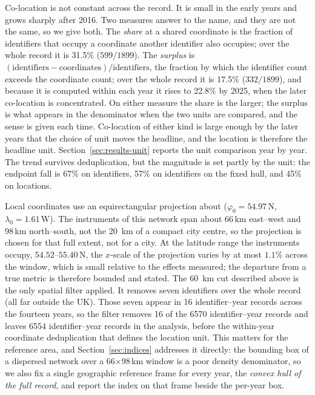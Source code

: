 \documentclass{article}
\newcommand{\rDrop}{67}
\newcommand{\locHullDrop}{45}
\newcommand{\rHullDrop}{57}
\newcommand{\winEW}{66}
\newcommand{\winNS}{98}
\newcommand{\nAnalysed}{1899}
\newcommand{\nShared}{599}
\newcommand{\nSurplus}{332}
\newcommand{\sharePct}{31.5}
\newcommand{\surplusPct}{17.5}
\newcommand{\surplusMax}{22.8}
\begin{document}
Co-location is not constant across the record. It is small in the early years and grows
sharply after 2016. Two measures answer to the name, and they are not the same, so we give both.
The \emph{share} at a shared coordinate is the fraction of identifiers that
occupy a coordinate another identifier also occupies; over the whole record it is
\sharePct\% ($\nShared{}/\nAnalysed{}$). The \emph{surplus} is
$(\text{identifiers}-\text{coordinates})/\text{identifiers}$, the fraction
by which the identifier count exceeds the coordinate count; over the whole record it is
\surplusPct\% ($\nSurplus{}/\nAnalysed{}$), and because it is computed within each year it
rises to \surplusMax\% by 2025, when the later co-location is concentrated.
On either measure the share is the larger; the surplus is what appears in the denominator when
the two units are compared, and
the sense is given each time. Co-location of either kind is large enough by the later years that
the choice of unit moves the headline, and the location is therefore the headline unit.
Section~\ref{sec:results-unit} reports the unit comparison year by year. The trend survives
deduplication, but the magnitude is set partly by the unit: the endpoint fall is \rDrop\% on
identifiers, \rHullDrop\% on identifiers on the fixed hull, and \locHullDrop\% on locations.

Local coordinates use an equirectangular projection about
($\varphi_0 = 54.97$\textdegree\,N, $\lambda_0 = 1.61$\textdegree\,W). The instruments of this network
span about \winEW\,km east--west and \winNS\,km north--south, not the \SI{20}{\kilo\meter} of a
compact city centre, so the projection is chosen for that full extent, not for a city.
At the latitude range the instruments occupy, $54.52$\textdegree--$55.40$\textdegree\,N, the
$x$-scale of the projection varies by at most $1.1\%$ across the window, which is small relative
to the effects measured; the departure from a true metric is therefore bounded and stated. The
\SI{60}{\kilo\meter} cut described above is the only spatial filter applied. It removes seven
identifiers over the whole record (all far outside the UK). Those seven appear in
\num{16} identifier--year records across the fourteen years, so the filter removes \num{16} of the
\num{6570} identifier--year records and leaves \num{6554}
identifier--year records in the analysis, before the within-year coordinate deduplication that
defines the location unit.
This matters for the reference area, and Section~\ref{sec:indices} addresses it directly: the
bounding box of a dispersed network over a \winEW$\times$\winNS\,km window is a poor density
denominator, so we also fix a single geographic reference frame for every year, the
\emph{convex hull of the full record}, and report the index on that frame beside the per-year
box.
\end{document}
